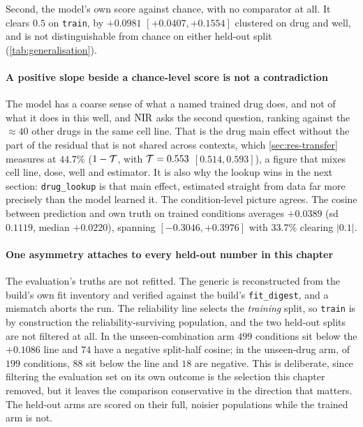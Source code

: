 Second, the model's own score against chance, with no comparator at all. It
clears $0.5$ on \texttt{train}, by $+0.0981$
\nolinebreak[3]$[+0.0407, +0.1554]$ clustered on drug and well, and is not
distinguishable from chance on either held-out split
(\cref{tab:generalisation}).

\paragraph{A positive slope beside a chance-level score is not a contradiction}
The model has a coarse sense of what a named trained drug does, and not of what
it does in this well, and $\textrm{NIR}$ asks the second question, ranking against the
$\approx 40$ other drugs in the same cell line. That is the drug main effect
without the part of the residual that is not shared across contexts, which
\cref{sec:res-transfer} measures at $44.7\%$ ($1 - \mathcal{T}$, with
$\mathcal{T} = 0.553$ \nolinebreak[3]$[0.514, 0.593]$), a figure that mixes cell line,
dose, well and estimator. It is also why the lookup wins in the next section:
\texttt{drug\_lookup} is that main effect, estimated straight from data far more
precisely than the model learned it. The condition-level picture agrees. The
cosine between prediction and own truth on trained conditions averages $+0.0389$
(sd $0.1119$, median $+0.0220$), spanning $[-0.3046, +0.3976]$ with $33.7\%$
clearing $|0.1|$.

\paragraph{One asymmetry attaches to every held-out number in this chapter} The
evaluation's truths are not refitted. The generic is reconstructed from the
build's own fit inventory and verified against the build's \texttt{fit\_digest},
and a mismatch aborts the run. The reliability line selects the \emph{training}
split, so \texttt{train} is by construction the reliability-surviving population,
and the two held-out splits are not filtered at all. In the unseen-combination
arm $\num{499}$ conditions sit below the $+0.1086$ line and $\num{74}$ have a
negative split-half cosine; in the unseen-drug arm, of $\num{199}$ conditions,
$\num{88}$ sit below the line and $\num{18}$ are negative. This is deliberate,
since filtering the evaluation set on its own outcome is the selection this
chapter removed, but it leaves the comparison conservative in the direction that
matters. The held-out arms are scored on their full, noisier populations while
the trained arm is not.

